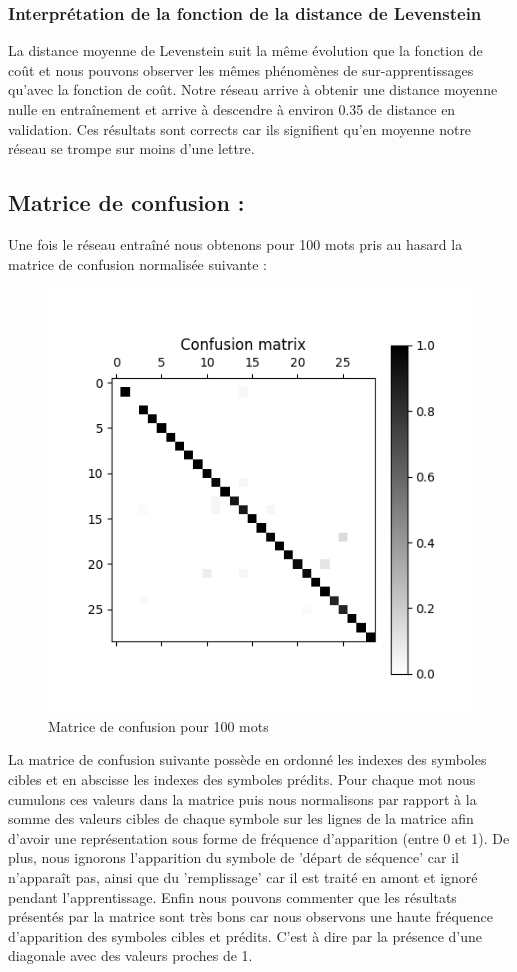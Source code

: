     \subsubsection{Interprétation de la fonction de la distance de Levenstein}
        La distance moyenne de Levenstein suit la même évolution que la fonction de coût et nous pouvons observer les mêmes phénomènes de sur-apprentissages qu'avec la fonction de coût. Notre réseau arrive à obtenir une distance moyenne nulle en entraînement et arrive à descendre à environ 0.35 de distance en validation. Ces résultats sont corrects car ils signifient qu'en moyenne notre réseau se trompe sur moins d'une lettre.



\subsection{Matrice de confusion :}
    Une fois le réseau entraîné nous obtenons pour 100 mots pris au hasard la matrice de confusion normalisée suivante :
    \begin{figure}[!ht]
        \centering
        \includegraphics[width=120mm]{sections/images/interpretation/bidir matrix.png}
        \caption{Matrice de confusion pour 100 mots}
        \label{fig:Figure 11  }
    \end{figure}
    La matrice de confusion suivante possède en ordonné les indexes des symboles cibles et en abscisse les indexes des symboles prédits. 
    Pour chaque mot nous cumulons ces valeurs dans la matrice puis nous normalisons par rapport à la somme des valeurs cibles de chaque symbole sur les lignes de la matrice afin d'avoir une représentation sous forme de fréquence d'apparition (entre 0 et 1). De plus, nous ignorons l'apparition du symbole de 'départ de séquence' car il n'apparaît pas, ainsi que du 'remplissage' car il est traité en amont et ignoré pendant l'apprentissage. Enfin nous pouvons commenter que les résultats présentés par la matrice sont très bons car nous observons une haute fréquence d'apparition des symboles cibles et prédits. C'est à dire par la présence d'une diagonale avec des valeurs proches de 1.
    
